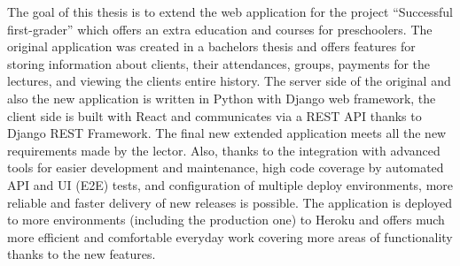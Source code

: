 The goal of this thesis is to extend the web application for the project ``Successful first-grader'' which offers an extra education and courses for preschoolers. The original application was created in a bachelor\textquotesingle s thesis and offers features for storing information about clients, their attendances, groups, payments for the lectures, and viewing the client\textquotesingle s entire history. The server side of the original and also the new application is written in Python with Django web framework, the client side is built with React and communicates via a REST API thanks to Django REST Framework. The final new extended application meets all the new requirements made by the lector. Also, thanks to the integration with advanced tools for easier development and maintenance, high code coverage by automated API and UI (E2E) tests, and configuration of multiple deploy environments, more reliable and faster delivery of new releases is possible. The application is deployed to more environments (including the production one) to Heroku and offers much more efficient and comfortable everyday work covering more areas of functionality thanks to the new features.
